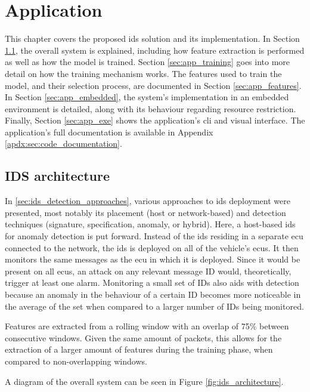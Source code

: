 \chapter{Application}
\label{c:application}

This chapter covers the proposed \gls{ids} solution and its implementation. In Section \ref{sec:app_architecture}, the overall system is explained, including how feature extraction is performed as well as how the model is trained. Section \ref{sec:app_training} goes into more detail on how the training mechanism works. The features used to train the model, and their selection process, are documented in Section \ref{sec:app_features}. In Section \ref{sec:app_embedded}, the system's implementation in an embedded environment is detailed, along with its behaviour regarding resource restriction. Finally, Section \ref{sec:app_exe} shows the application's \gls{cli} and visual interface. The application's full documentation is available in Appendix \ref{apdx:sec:code_documentation}.

\section{IDS architecture}
\label{sec:app_architecture}

In \ref{sec:ids_detection_approaches}, various approaches to \gls{ids} deployment were presented, most notably its placement (host or network-based) and detection techniques (signature, specification, anomaly, or hybrid). Here, a host-based \gls{ids} for anomaly detection is put forward. Instead of the \gls{ids} residing in a separate \gls{ecu} connected to the network, the \gls{ids} is deployed on all of the vehicle's \glspl{ecu}. It then monitors the same messages as the \gls{ecu} in which it is deployed. Since it would be present on all \glspl{ecu}, an attack on any relevant message ID would, theoretically, trigger at least one alarm. Monitoring a small set of IDs also aids with detection because an anomaly in the behaviour of a certain ID becomes more noticeable in the average of the set when compared to a larger number of IDs being monitored.\par
Features are extracted from a rolling window with an overlap of 75\% between consecutive windows. Given the same amount of packets, this allows for the extraction of a larger amount of features during the training phase, when compared to non-overlapping windows.\par
A diagram of the overall system can be seen in Figure \ref{fig:ids_architecture}.

